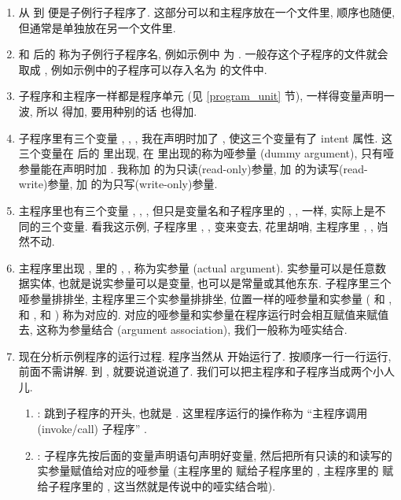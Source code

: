 \begin{enumerate} 
    \item 从  到  便是子例行子程序了. 这部分可以和主程序放在一个文件里, 顺序也随便, 但通常是单独放在另一个文件里. 
    \item {} 和  后的  称为子例行子程序名, 例如示例中  为 . 一般存这个子程序的文件就会取成 , 例如示例中的子程序可以存入名为  的文件中.
    \item 子程序和主程序一样都是程序单元 (见 \ref{program_unit} 节), 一样得变量声明一波, 所以  得加, 要用种别的话  也得加. 
    \item 子程序里有三个变量 , , , 我在声明时加了 , 使这三个变量有了 intent 属性. 这三个变量在  后的 \ttt{()} 里出现, 在 \ttt{()} 里出现的称为哑参量 (dummy argument), 只有哑参量能在声明时加 . 我称加  的为只读(read-only)参量, 加  的为读写(read-write)参量, 加  的为只写(write-only)参量. 
    \item 主程序里也有三个变量 , , , 但只是变量名和子程序里的 , ,  一样, 实际上是不同的三个变量. 看我这示例, 子程序里 , ,  变来变去, 花里胡哨, 主程序里 , ,  岿然不动. 
    \item 主程序里出现 , \ttt{()} 里的 , ,  称为实参量 (actual argument). 实参量可以是任意数据实体, 也就是说实参量可以是变量, 也可以是常量或其他东东. 子程序里三个哑参量排排坐, 主程序里三个实参量排排坐, 位置一样的哑参量和实参量 ( 和 ,  和 ,  和 ) 称为对应的. 对应的哑参量和实参量在程序运行时会相互赋值来赋值去, 这称为参量结合 (argument association), 我们一般称为哑实结合. 
    \item 现在分析示例程序的运行过程. 程序当然从  开始运行了. 按顺序一行一行运行, 前面不需讲解. 到 , 就要说道说道了. 我们可以把主程序和子程序当成两个小人儿. \begin{enumerate} 
        \item {}: 跳到子程序的开头, 也就是 .  这里程序运行的操作称为 ``主程序调用 (invoke/call) 子程序'' . 
        \item {}: 子程序先按后面的变量声明语句声明好变量, 然后把所有只读的和读写的实参量赋值给对应的哑参量 (主程序里的  赋给子程序里的 , 主程序里的  赋给子程序里的 , 这当然就是传说中的哑实结合啦). 

\end{enumerate}
\end{enumerate}
